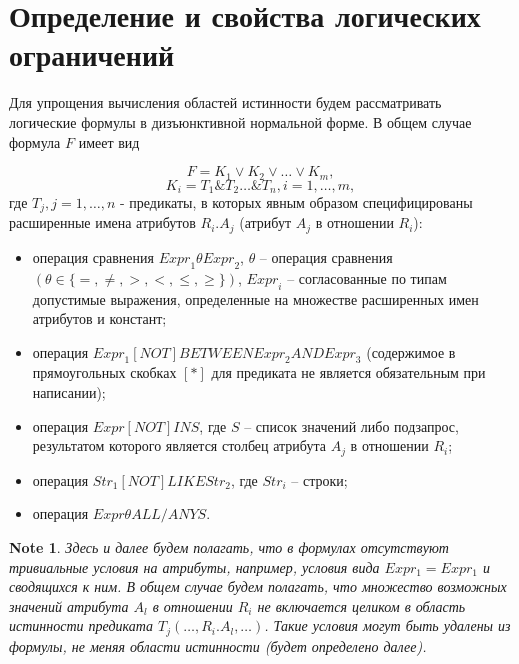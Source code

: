 \documentclass[10pt,a4paper]{article}
\newtheorem{note}{Note}
\def \n #1{\mathit{#1}}
\begin{document}
\section{Определение и свойства логических ограничений}

Для упрощения вычисления областей истинности будем рассматривать логические формулы в дизъюнктивной
нормальной форме. В общем случае формула $F$ имеет вид 

\begin{equation}
F = K_1 \vee K_2 \vee \dots \vee K_m ,
\label{def_F_1}
\end{equation}
\begin{equation}
K_i = T_1 \& T_2 \dots \& T_n, i = 1, \dots, m ,
\label{def_F_2}
\end{equation}
где $T_j, j = 1, \dots, n$ - предикаты, в которых явным образом
специфицированы расширенные имена атрибутов $R_i.A_j$ (атрибут $A_j$ в отношении
$R_i$):
\begin{itemize}
  \item	операция сравнения $ \n{Expr}_1 \theta \n{Expr}_2$, $\theta$ – операция
  сравнения $(\theta \in \{=, \neq, >, <, \leq, \geq\})$, $\n{Expr}_i$ –
  согласованные по типам допустимые выражения, определенные на множестве
  расширенных имен атрибутов и констант;
  \item операция $\n{Expr}_1 \n{[NOT]} \n{BETWEEN} \n{Expr}_2 \n{AND}
  \n{Expr}_3$ (содержимое в прямоугольных скобках $[*]$ для предиката не
  является обязательным при написании);
  \item операция $\n{Expr} \n{[NOT]} \n{IN} S$, где $S$ – список значений либо
  подзапрос, результатом которого является столбец атрибута $A_j$ в отношении
  $R_i$;
  \item операция $\n{Str}_1 \n{[NOT]} \n{LIKE} \n{Str}_2$, где $\n{Str}_i$ –
  строки;
  \item операция $\n{Expr} \theta \n{ALL/ANY} S$.
\end{itemize}

\begin{note}
Здесь и далее будем полагать, что в формулах отсутствуют тривиальные условия на
атрибуты, например, условия вида $Expr_1 = Expr_1$ и сводящихся к ним.
В общем случае будем полагать, что множество возможных значений атрибута $A_l$
в отношении $R_i$ не включается целиком в область истинности предиката $T_j (\dots , R_i . A_l ,\dots )$. Такие
условия могут быть удалены из формулы, не меняя области истинности (будет
определено далее).
\label{trivial}
\end{note}
\end{document}
